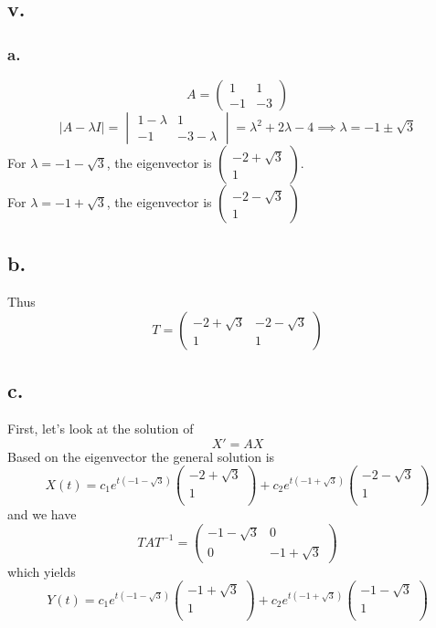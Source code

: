 \documentclass[11pt]{article}
\theoremstyle{mystyle}
\theoremstyle{definition}
\begin{document}
\subsection*{v.}
\subsubsection*{a.}
\[
  A = 
  \begin{pmatrix}
    1 & 1 \\
    -1 & -3
  \end{pmatrix}
\]
\[
  |A-\lambda I |= 
  \begin{vmatrix}
    1 - \lambda & 1 \\
    -1 & -3-\lambda
  \end{vmatrix}
  = \lambda^2 + 2\lambda - 4 
  \implies \lambda = -1 \pm \sqrt{3} 
\]
For $\lambda = -1 -\sqrt{3}$, the eigenvector is 
$\begin{pmatrix}
  -2 + \sqrt{3} \\
  1
\end{pmatrix}
$. \\
For $\lambda = -1 + \sqrt{3}$, the eigenvector is 
$\begin{pmatrix}
  -2 - \sqrt{3} \\
  1
\end{pmatrix}
$
\subsection*{b.}
Thus 
\[
  T = 
  \begin{pmatrix}
    -2 + \sqrt{3} & - 2 - \sqrt{3} \\
    1 & 1
  \end{pmatrix}
\]
\subsection*{c.}
First, let's look at the solution of 
\[
  X' = AX
\]
Based on the eigenvector the general solution is 
\[
  X(t) = c_1 e^{t(-1-\sqrt{3})} 
  \begin{pmatrix}
    -2 + \sqrt{3} \\
    1 \\
  \end{pmatrix}
  + c_2 e^{t(-1 + \sqrt{3})}
  \begin{pmatrix}
    -2 - \sqrt{3} \\
    1 \\
  \end{pmatrix}
\]
and we have 
\[
  T A T^{-1} = 
  \begin{pmatrix}
    -1 - \sqrt{3} & 0 \\
    0 & -1 + \sqrt{3} 
  \end{pmatrix}
\]
which yields 
\[
  Y(t) = c_1 e^{t(-1-\sqrt{3})} 
  \begin{pmatrix}
    -1 + \sqrt{3} \\
    1 \\
  \end{pmatrix}
  + c_2 e^{t(-1 + \sqrt{3})}
  \begin{pmatrix}
    -1 - \sqrt{3} \\
    1 \\
  \end{pmatrix}
\]
\end{document}
